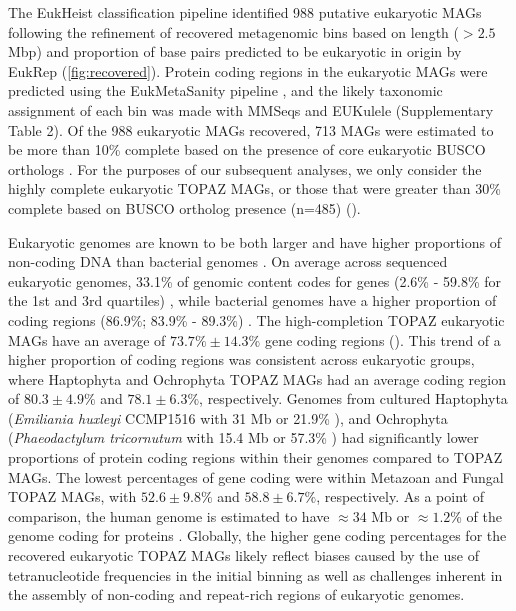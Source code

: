 \documentclass[12pt]{article}
\numberwithin{equation}{section}
\begin{document}
The EukHeist classification pipeline identified 988 putative eukaryotic MAGs following the refinement of recovered metagenomic bins based on length ($>2.5$ Mbp) and proportion of base pairs predicted to be eukaryotic in origin by EukRep \citep{West2018Genome-reconstruction} (\ref{fig:recovered}). Protein coding regions in the eukaryotic MAGs were predicted using the EukMetaSanity pipeline \citep{EukMS}, and the likely taxonomic assignment of each bin was made with MMSeqs \citep{Steinegger2018} and EUKulele \citep{Krinos2021EUKulele} (Supplementary Table 2). Of the 988 eukaryotic MAGs recovered, 713 MAGs were estimated to be more than 10\% complete based on the presence of core eukaryotic BUSCO orthologs \citep{Simao2015BUSCO}. For the purposes of our subsequent analyses, we only consider the highly complete eukaryotic TOPAZ MAGs, or those that were greater than 30\% complete based on BUSCO ortholog presence (n=485) (). 

Eukaryotic genomes are known to be both larger and have higher proportions of non-coding DNA than bacterial genomes \citep{Zhang2011practical}. On average across sequenced eukaryotic genomes, 33.1\% of genomic content codes for genes (2.6\% - 59.8\% for the 1st and 3rd quartiles) \citep{Hou_2009}, while bacterial genomes have a higher proportion of coding regions (86.9\%; 83.9\% - 89.3\%) \citep{Hou_2009}. The high-completion TOPAZ eukaryotic MAGs have an average of $73.7\% \pm 14.3\%$ gene coding regions (). This trend of a higher proportion of coding regions was consistent across eukaryotic groups, where Haptophyta and Ochrophyta TOPAZ MAGs had an average coding region of $80.3 \pm 4.9\%$ and $78.1 \pm 6.3\%$, respectively. Genomes from cultured Haptophyta (\textit{Emiliania huxleyi} CCMP1516 with 31 Mb or 21.9\% \citep{Read2013}), and Ochrophyta (\textit{Phaeodactylum tricornutum} with 15.4 Mb or 57.3\% \citep{Bowler_2008}) had significantly lower proportions of protein coding regions within their genomes compared to TOPAZ MAGs. The lowest percentages of gene coding were within Metazoan and Fungal TOPAZ MAGs, with $52.6\pm 9.8\%$ and  $58.8 \pm 6.7\%$, respectively. As a point of comparison, the human genome is estimated to have $\approx 34$ Mb or $\approx 1.2$\% of the  genome coding for proteins \citep{humangenome}. Globally, the higher gene coding percentages for the recovered eukaryotic TOPAZ MAGs likely reflect biases caused by the use of tetranucleotide frequencies in the initial binning \citep{Kang_2019} as well as challenges inherent in the assembly of non-coding and repeat-rich regions of eukaryotic genomes. 
\end{document}
